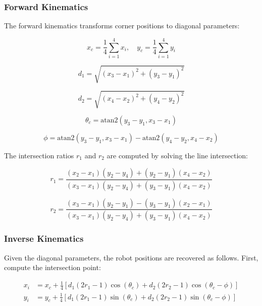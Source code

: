 \documentclass[lettersize,journal]{IEEEtran}
\begin{document}
\subsubsection{Forward Kinematics}

The forward kinematics transforms corner positions to diagonal parameters:

\begin{equation}
x_c = \frac{1}{4}\sum_{i=1}^{4} x_i, \quad y_c = \frac{1}{4}\sum_{i=1}^{4} y_i
\end{equation}

\begin{equation}
d_1 = \sqrt{(x_3 - x_1)^2 + (y_3 - y_1)^2}
\end{equation}

\begin{equation}
d_2 = \sqrt{(x_4 - x_2)^2 + (y_4 - y_2)^2}
\end{equation}

\begin{equation}
\theta_c = \text{atan2}(y_3 - y_1, x_3 - x_1)
\end{equation}

\begin{equation}
\phi = \text{atan2}(y_3 - y_1, x_3 - x_1) - \text{atan2}(y_4 - y_2, x_4 - x_2)
\end{equation}

The intersection ratios $r_1$ and $r_2$ are computed by solving the line intersection:

\begin{equation}
r_1 = \frac{(x_2 - x_1)(y_2 - y_4) + (y_2 - y_1)(x_4 - x_2)}{(x_3 - x_1)(y_2 - y_4) + (y_3 - y_1)(x_4 - x_2)}
\end{equation}

\begin{equation}
r_2 = \frac{(x_3 - x_1)(y_2 - y_1) - (y_3 - y_1)(x_2 - x_1)}{(x_3 - x_1)(y_2 - y_4) + (y_3 - y_1)(x_4 - x_2)}
\end{equation}

\subsubsection{Inverse Kinematics}

Given the diagonal parameters, the robot positions are recovered as follows. First, compute the intersection point:

\begin{equation}
\begin{aligned}
x_i &= x_c + \frac{1}{4}\left[d_1(2r_1 - 1)\cos(\theta_c) + d_2(2r_2 - 1)\cos(\theta_c - \phi)\right] \\
y_i &= y_c + \frac{1}{4}\left[d_1(2r_1 - 1)\sin(\theta_c) + d_2(2r_2 - 1)\sin(\theta_c - \phi)\right]
\end{aligned}
\end{equation}
\end{document}
